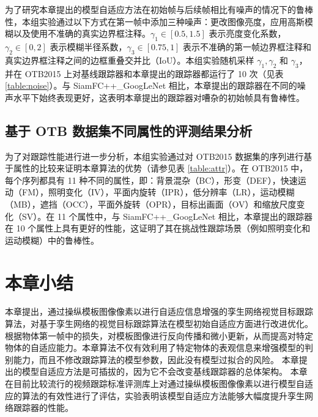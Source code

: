 为了研究本章提出的模型自适应方法在初始帧与后续帧相比有噪声的情况下的鲁棒性，本组实验通过以下方式在第一帧中添加三种噪声：更改图像亮度，应用高斯模糊以及使用不准确的真实边界框注释。$\gamma_1 \in [0.5, 1.5]$ 表示亮度变化系数，$\gamma_2 \in [0, 2]$ 表示模糊半径系数，$\gamma_3 \in [0.75, 1]$ 表示不准确的第一帧边界框注释和真实边界框注释之间的边框重叠交并比（IoU）。本组实验随机采样 $\gamma_1, \gamma_2$ 和 $\gamma_3$，并在 OTB2015 上对基线跟踪器和本章提出的跟踪器都运行了 10 次（见表 \ref{table:noise}）。与 SiamFC++\_GoogLeNet \cite{SiamFC++} 相比，本章提出的跟踪器在不同的噪声水平下始终表现更好，这表明本章提出的跟踪器对嘈杂的初始帧具有鲁棒性。

\subsection{基于 OTB 数据集不同属性的评测结果分析}
为了对跟踪性能进行进一步分析，本组实验通过对 OTB2015 数据集的序列进行基于属性的比较来证明本章算法的优势（请参见表 \ref{table:attr}）。在 OTB2015 中，每个序列都具有 11 种不同的属性，即：背景混杂（BC），形变（DEF），快速运动（FM），照明变化（IV），平面内旋转（IPR），低分辨率（LR），运动模糊（MB），遮挡（OCC），平面外旋转（OPR），目标出画面（OV）和缩放尺度变化（SV）。在 11 个属性中，与 SiamFC++\_GoogLeNet \cite{SiamFC++} 相比，本章提出的跟踪器在 10 个属性上具有更好的性能，这证明了其在挑战性跟踪场景（例如照明变化和运动模糊）中的鲁棒性。

\begin{table}[t!]
\centering
\caption{基于评测库 OTB2015 的 11 个属性标注的算法跟踪成功率对比展示。}
\label{table:attr}
\end{table}

\section{本章小结}
本章提出，通过操纵模板图像像素以进行自适应信息增强的孪生网络视觉目标跟踪算法，对基于孪生网络的视觉目标跟踪算法在模型初始自适应方面进行改进优化。根据物体第一帧中的损失，对模板图像进行反向传播和微小更新，从而提高对特定物体的自适应能力。本章算法不仅有效利用了特定物体的表观信息来增强模型的判别能力，而且不修改跟踪算法的模型参数，因此没有模型过拟合的风险。
本章提出的模型自适应方法是可插拔的，因为它不会改变基线跟踪器的总体架构。
本章在目前比较流行的视频跟踪标准评测库上对通过操纵模板图像像素以进行模型自适应的算法的有效性进行了评估，实验表明该模型自适应方法能够大幅度提升孪生网络跟踪器的性能。